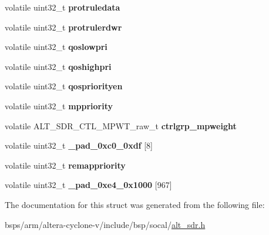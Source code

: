 \begin{DoxyCompactItemize}
\mbox{\label{structALT__SDR__CTL__raw__s_aebbc86d4fbe14be47dd1f224abbedf01}} 
volatile uint32\+\_\+t {\bfseries protruledata}
\item 
\mbox{\label{structALT__SDR__CTL__raw__s_a0bef0cf2cac21e3b2665c97b0fffb5dd}} 
volatile uint32\+\_\+t {\bfseries protrulerdwr}
\item 
\mbox{\label{structALT__SDR__CTL__raw__s_afd10b492abefa3796ba32b401775b006}} 
volatile uint32\+\_\+t {\bfseries qoslowpri}
\item 
\mbox{\label{structALT__SDR__CTL__raw__s_a481013d9f9871800309d5091f9e5b127}} 
volatile uint32\+\_\+t {\bfseries qoshighpri}
\item 
\mbox{\label{structALT__SDR__CTL__raw__s_aabb2cf63ecfc3d9acf4e36cb635849be}} 
volatile uint32\+\_\+t {\bfseries qospriorityen}
\item 
\mbox{\label{structALT__SDR__CTL__raw__s_add0b2cbe270bed6fcb8dd02e1e74587f}} 
volatile uint32\+\_\+t {\bfseries mppriority}
\item 
\mbox{\label{structALT__SDR__CTL__raw__s_a3a9ac931059d69121a034cc4920c050e}} 
volatile A\+L\+T\+\_\+\+S\+D\+R\+\_\+\+C\+T\+L\+\_\+\+M\+P\+W\+T\+\_\+raw\+\_\+t {\bfseries ctrlgrp\+\_\+mpweight}
\item 
\mbox{\label{structALT__SDR__CTL__raw__s_af16d49fa0d642cb67553998296305852}} 
volatile uint32\+\_\+t {\bfseries \+\_\+pad\+\_\+0xc0\+\_\+0xdf} \mbox{[}8\mbox{]}
\item 
\mbox{\label{structALT__SDR__CTL__raw__s_a5c5d3628d86e0ba3b0468e37939d2952}} 
volatile uint32\+\_\+t {\bfseries remappriority}
\item 
\mbox{\label{structALT__SDR__CTL__raw__s_aefb4b544b8964c185615bdebec1e0c1a}} 
volatile uint32\+\_\+t {\bfseries \+\_\+pad\+\_\+0xe4\+\_\+0x1000} \mbox{[}967\mbox{]}
\end{DoxyCompactItemize}


The documentation for this struct was generated from the following file\+:\begin{DoxyCompactItemize}
\item 
bsps/arm/altera-\/cyclone-\/v/include/bsp/socal/\mbox{\hyperlink{alt__sdr_8h}{alt\+\_\+sdr.\+h}}\end{DoxyCompactItemize}

